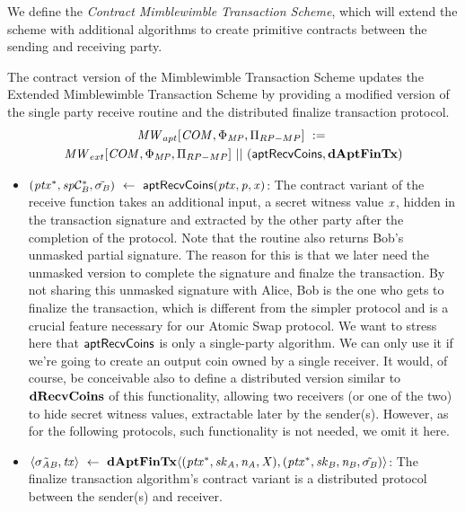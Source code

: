 We define the \emph{Contract Mimblewimble Transaction Scheme}, which will extend the scheme with additional algorithms to create primitive contracts between the sending and receiving party.

\begin{definition}
    \label{def:atom:apt-ext-mw-tx-scheme}
    The contract version of the Mimblewimble Transaction Scheme updates the Extended Mimblewimble Transaction Scheme by providing a modified version of the single party receive routine and the distributed finalize transaction protocol.
    \begin{gather*}
        \mathit{MW}_{apt}[\mathit{COM},\Phi_{\mathit{MP}},\Pi_{RP-MP}] ~:=~ \\ \mathit{MW}_{ext}[\mathit{COM},\Phi_{\mathit{MP}},\Pi_{RP-MP}] ~||~ (\mathsf{aptRecvCoins}, \mathbf{dAptFinTx})
    \end{gather*}
    \begin{itemize}
        \item $(\mathit{ptx}^*, \mathit{sp}\mathcal{C}_{\mathit{B}}^*, \tilde{\sigma_{\mathit{B}}}) ~\leftarrow~ \mathsf{aptRecvCoins}(\mathit{ptx},\mathit{p},\mathit{x})$: The contract variant of the receive function takes an additional input, a secret witness value
        $\mathit{x}$, hidden in the transaction signature and extracted by the other party after the completion of the protocol.
        Note that the routine also returns Bob's unmasked partial signature.
        The reason for this is that we later need the unmasked version to complete the signature and finalze the transaction.
        By not sharing this unmasked signature with Alice, Bob is the one who gets to finalize the transaction, which is different from the simpler protocol and is a crucial feature necessary for our Atomic Swap protocol.
        We want to stress here that $\mathsf{aptRecvCoins}$ is only a single-party algorithm.
        We can only use it if we're going to create an output coin owned by a single receiver.
        It would, of course, be conceivable also to define a distributed version similar to $\mathbf{dRecvCoins}$ of this functionality, allowing two receivers (or one of the two) to hide secret witness values, extractable later by the sender(s).
        However, as for the following protocols, such functionality is not needed, we omit it here.
        \item $\langle \tilde{\sigma_{\mathit{A}\mathit{B}}}, \mathit{tx} \rangle ~\leftarrow~ \mathbf{dAptFinTx} \langle (\mathit{ptx}^*,\mathit{sk}_{\mathit{A}},\mathit{\mathit{n}_{\mathit{A}}},\mathit{X}), (\mathit{ptx}^*,\mathit{sk}_{\mathit{B}},\mathit{\mathit{n}_{\mathit{B}}},\tilde{\sigma_{\mathit{B}}}) \rangle$: The finalize transaction algorithm's contract variant is a distributed protocol between the sender(s) and receiver.

\end{itemize}
\end{definition}
